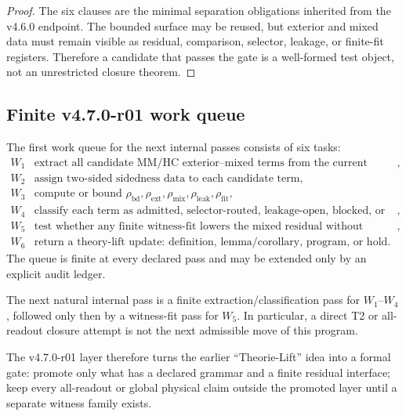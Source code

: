 \begin{proof}
The six clauses are the minimal separation obligations inherited from the
v4.6.0 endpoint.  The bounded surface may be reused, but exterior and mixed data
must remain visible as residual, comparison, selector, leakage, or finite-fit
registers.  Therefore a candidate that passes the gate is a well-formed test
object, not an unrestricted closure theorem.
\end{proof}

\subsection{Finite v4.7.0-r01 work queue}
\label{subsec:v470-r01-finite-work-queue}

\begin{definition}
\label{def:v470-r01-first-work-queue}
The first work queue for the next internal passes consists of six tasks:
\[
\begin{array}{ll}
W_1 & \text{extract all candidate MM/HC exterior--mixed terms from the current object language},\\
W_2 & \text{assign two-sided sidedness data to each candidate term},\\
W_3 & \text{compute or bound }\rho_{\mathrm{bd}},\rho_{\mathrm{ext}},\rho_{\mathrm{mix}},\rho_{\mathrm{leak}},\rho_{\mathrm{fit}},\\
W_4 & \text{classify each term as admitted, selector-routed, leakage-open, blocked, or residual},\\
W_5 & \text{test whether any finite witness-fit lowers the mixed residual without relaxing exactness},\\
W_6 & \text{return a theory-lift update: definition, lemma/corollary, program, or hold}.
\end{array}
\]
The queue is finite at every declared pass and may be extended only by an
explicit audit ledger.
\end{definition}

\begin{corollary}
\label{cor:v470-r01-permitted-r02-direction}
The next natural internal pass is a finite extraction/classification pass for
\(W_1\)--\(W_4\), followed only then by a witness-fit pass for \(W_5\).  In
particular, a direct T2 or all-readout closure attempt is not the next admissible
move of this program.
\end{corollary}

\begin{remark}[Summary]
The v4.7.0-r01 layer therefore turns the earlier ``Theorie-Lift'' idea into a
formal gate: promote only what has a declared grammar and a finite residual
interface; keep every all-readout or global physical claim outside the promoted
layer until a separate witness family exists.
\end{remark}


